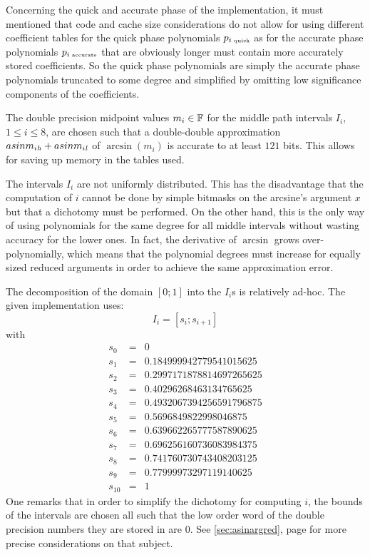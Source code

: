 Concerning the quick and accurate phase of the implementation, it must
mentioned that code and cache size considerations do not allow for
using different coefficient tables for the quick phase polynomials
$p_{i\mbox{\tiny ~quick}}$ as for the accurate phase polynomials
$p_{i\mbox{\tiny ~accurate}}$ that are obviously longer must contain
more accurately stored coefficients. So the quick phase polynomials are
simply the accurate phase polynomials truncated to some degree and simplified 
by omitting low significance components of the coefficients.

The double precision midpoint values $m_i \in \mathbb {F}$ for the middle path
intervals $I_i$, $1 \leq i \leq 8$, are chosen such that a
double-double approximation $asinm_{i\mathit{h}} + asinm_{i\mathit{l}}$ of
$\arcsin\left( m_i \right)$ is accurate to at least $121$ bits. This
allows for saving up memory in the tables used.

The intervals $I_i$ are not uniformly distributed. This has the
disadvantage that the computation of $i$ cannot be done by simple
bitmasks on the arcsine's argument $x$ but that a dichotomy must be
performed. On the other hand, this is the only way of using
polynomials for the same degree for all middle intervals without
wasting accuracy for the lower ones. In fact, the derivative of
$\arcsin$ grows over-polynomially, which means that the polynomial
degrees must increase for equally sized reduced arguments in order to
achieve the same approximation error. 

The decomposition of the domain $\left[0;1\right]$ into the $I_i$s is
relatively ad-hoc. The given implementation uses:
$$I_i = \left[s_i;s_{i+1}\right]$$
with
\begin{eqnarray*}
s_0 & = & 0 \\
s_1 & = & 0.184999942779541015625  \\
s_2 & = & 0.2997171878814697265625  \\
s_3 & = & 0.40296268463134765625  \\
s_4 & = & 0.4932067394256591796875  \\
s_5 & = & 0.5696849822998046875  \\
s_6 & = & 0.639662265777587890625  \\
s_7 & = & 0.696256160736083984375 \\
s_8 & = & 0.741760730743408203125  \\
s_9 & = & 0.77999973297119140625  \\
s_{10} & = & 1 
\end{eqnarray*}
One remarks that in order to simplify the dichotomy for computing $i$,
the bounds of the intervals are chosen all such that the low order
word of the double precision numbers they are stored in are $0$. See
\ref{sec:asinargred}, page \pageref{sec:asinargred} for more precise
considerations on that subject.

